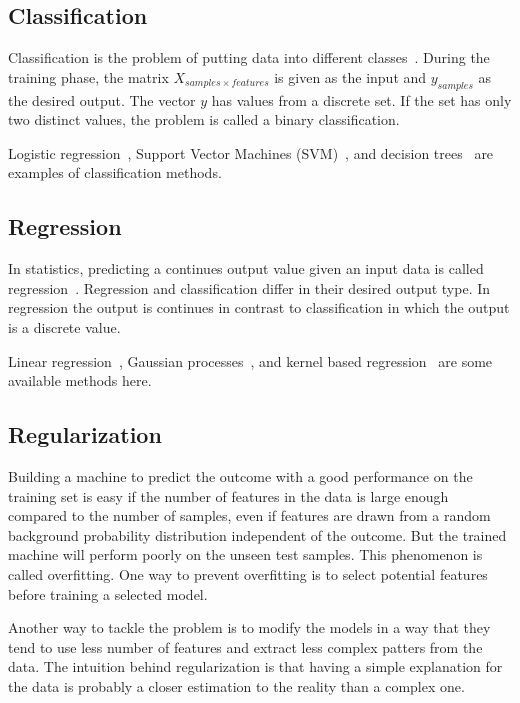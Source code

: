\subsection{Classification}
Classification is the problem of putting data into different classes~\cite{classification}. During the training phase, the matrix $X_{samples \times features}$ is given as the input and $y_{samples}$ as the desired output. The vector $y$ has values from a discrete set. If the set has only two distinct values, the problem is called a binary classification.

Logistic regression~\cite{logistic-regression}, Support Vector Machines (SVM)~\cite{svm}, and decision trees~\cite{decision-trees} are examples of classification methods.

\subsection{Regression}
In statistics, predicting a continues output value given an input data is called regression~\cite{regression}. Regression and classification differ in their desired output type. In regression the output is continues in contrast to classification in which the output is a discrete value.

Linear regression~\cite{linear-regression}, Gaussian processes~\cite{gaussian-processes}, and kernel based regression~\cite{kernel-based-regression} are some available methods here.

\subsection{Regularization}
Building a machine to predict the outcome with a good performance on the training set is easy if the number of features in the data is large enough compared to the number of samples, even if features are drawn from a random background probability distribution independent of the outcome. But the trained machine will perform poorly on the unseen test samples. This phenomenon is called overfitting. One way to prevent overfitting is to select potential features before training a selected model.

Another way to tackle the problem is to modify the models in a way that they tend to use less number of features and extract less complex patters from the data. The intuition behind regularization is that having a simple explanation for the data is probably a closer estimation to the reality than a complex one.

